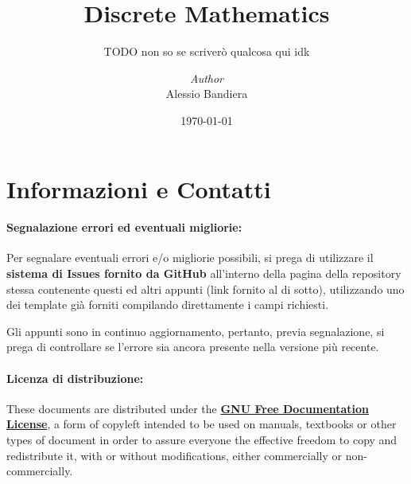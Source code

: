 \documentclass[a4paper, 12pt]{report}
\institute{\curlyquotes{\hspace{0.25mm}Sapienza} Università di Roma}
\title{Discrete Mathematics}
\subtitle{TODO non so se scriverò qualcosa qui idk}
\author{\textit{Author}\\Alessio Bandiera}
\date{\today}
\begin{document}
    \maketitle

    {
        \hypersetup{allcolors=black}

        \romantableofcontents
    }

    \chapter*{Informazioni e Contatti}      %

    \subsubsection{Segnalazione errori ed eventuali migliorie:}
    
    Per segnalare eventuali errori e/o migliorie possibili, si prega di utilizzare il \textbf{sistema di Issues fornito da GitHub} all'interno della pagina della repository stessa contenente questi ed altri appunti (link fornito al di sotto), utilizzando uno dei template già forniti compilando direttamente i campi richiesti.

    Gli appunti sono in continuo aggiornamento, pertanto, previa segnalazione, si prega di controllare se l'errore sia ancora presente nella versione più recente.

    \quad

    \subsubsection{Licenza di distribuzione:}
    
    These documents are distributed under the \textbf{\href{https://www.gnu.org/licenses/fdl-1.3.txt}{GNU Free Documentation License}}, a form of copyleft intended to be used on manuals, textbooks or other types of document in order to assure everyone the effective freedom to copy and redistribute it, with or without modifications, either commercially or non-commercially.
    
\end{document}
